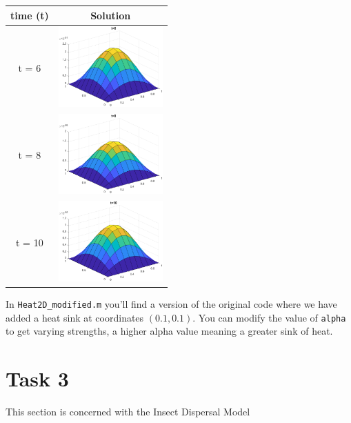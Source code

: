 \documentclass[]{report}
\def\incode#1{\texttt{#1}}
\begin{document}
	\begin{tabular}{|c|c|}
		\hline
		time (t) & Solution \\
		\hline
		t = 6 & \includegraphics[width=4cm]{heat/h2_t4.eps} \\
		\hline
		t = 8 & \includegraphics[width=4cm]{heat/h2_t5.eps} \\
		\hline
		t = 10 & \includegraphics[width=4cm]{heat/h2_t6.eps} \\
		\hline
	\end{tabular}
	In \incode{Heat2D\_modified.m} you'll find a version of the original code where we have added a heat sink at coordinates $(0.1, 0.1)$. You can modify the value of \incode{alpha} to get varying strengths, a higher alpha value meaning a greater sink of heat. 
	\section{Task 3}
	This section is concerned with the Insect Dispersal Model
	
\end{document}
